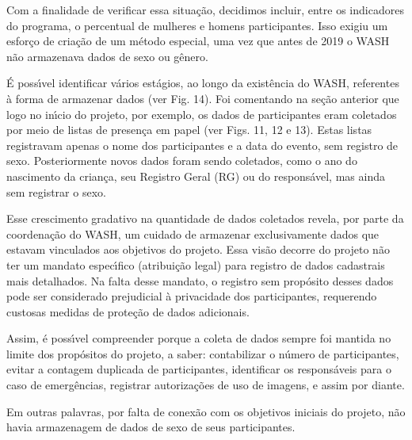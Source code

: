 \documentclass[
12pt,		%
openright,	%
twoside,  %
a4paper,			%
chapter=TITLE,		%
english,			%
french,				%
spanish,			%
brazil				%
]{USPSC-classe/USPSC}
\begin{document}
Com a finalidade de verificar essa situa\c{c}\~ao, decidimos incluir, entre os indicadores do programa, o percentual de mulheres e homens participantes. Isso exigiu um esfor\c{c}o de cria\c{c}\~ao de um m\'etodo especial, uma vez que antes de 2019 o WASH n\~ao armazenava dados de sexo ou g\^enero.








\'E poss\'{\i}vel identificar v\'arios est\'agios, ao longo da exist\^encia do WASH, referentes \`a forma de armazenar dados (ver Fig. 14). Foi comentando na se\c{c}\~ao anterior que logo no in\'{\i}cio do projeto, por exemplo, os dados de participantes eram coletados por meio de listas de presen\c{c}a em papel (ver Figs. 11, 12 e 13). Estas listas registravam apenas o nome dos participantes e a data do evento, sem registro de sexo. Posteriormente novos dados foram sendo coletados, como o ano do nascimento da crian\c{c}a, seu Registro Geral (RG) ou do respons\'avel, mas ainda sem registrar o sexo.








Esse crescimento gradativo na quantidade de dados coletados revela, por parte da coordena\c{c}\~ao do WASH, um cuidado de armazenar exclusivamente dados que estavam vinculados aos objetivos do projeto. Essa vis\~ao decorre do projeto n\~ao ter um mandato espec\'{\i}fico (atribui\c{c}\~ao legal) para registro de dados cadastrais mais detalhados. Na falta desse mandato, o registro sem prop\'osito desses dados pode ser considerado prejudicial \`a privacidade dos participantes, requerendo custosas medidas de prote\c{c}\~ao de dados adicionais.








Assim, \'e poss\'{\i}vel compreender porque a coleta de dados sempre foi mantida no limite dos prop\'ositos do projeto, a saber: contabilizar o n\'umero de participantes, evitar a contagem duplicada de participantes, identificar os respons\'aveis para o caso de emerg\^encias, registrar autoriza\c{c}\~oes de uso de imagens, e assim por diante.








Em outras palavras, por falta de conex\~ao com os objetivos iniciais do projeto, n\~ao havia armazenagem de dados de sexo de seus participantes.
\end{document}
